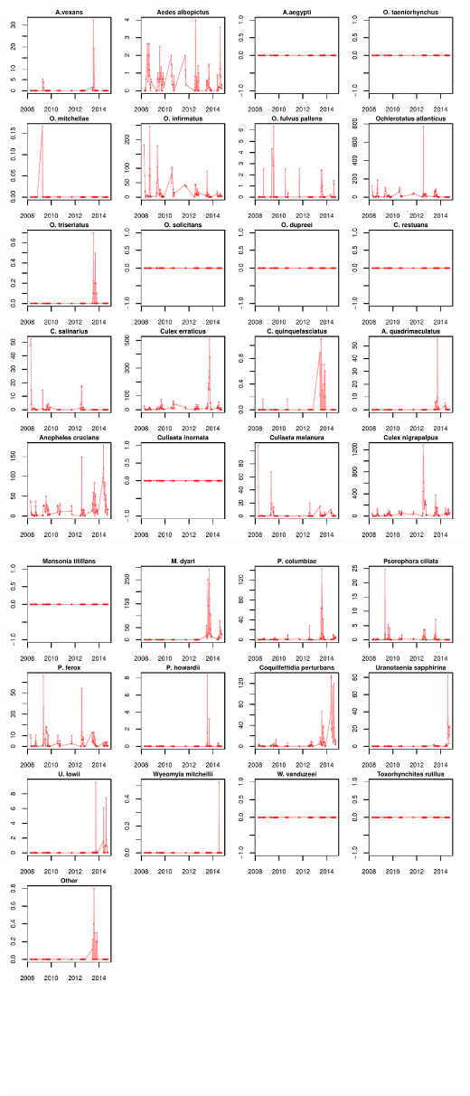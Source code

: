 \documentclass{article}
\begin{document}
\includegraphics{mosquitoReport-009}


\includegraphics{mosquitoReport-010}
\end{document}
